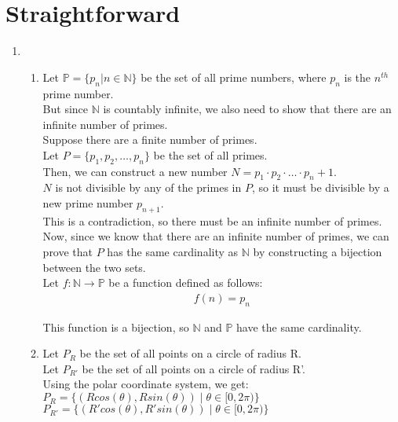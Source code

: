 \documentclass[a4paper]{article}
\begin{document}
\section{Straightforward}
    \begin{enumerate}
    \item \begin{enumerate}
        \item Let $\mathbb{P} = \{ p_n | n \in \mathbb{N} \}$ be the set of all prime numbers, where $p_n$ is the $n^{th}$ prime number.\\
        But since $\mathbb{N}$ is countably infinite, we also need to show that there are an infinite number of primes. \\
        
        Suppose there are a finite number of primes. \\
        Let $P = \{ p_1, p_2, \dots, p_n \}$ be the set of all primes. \\
        Then, we can construct a new number $N = p_1 \cdot p_2 \cdot \dots \cdot p_n + 1$.\\
        $N$ is not divisible by any of the primes in $P$, so it must be divisible by a new prime number $p_{n+1}$.\\
        This is a contradiction, so there must be an infinite number of primes.\\

        Now, since we know that there are an infinite number of primes, we can prove that $P$ has the same cardinality as $\mathbb{N}$ by constructing a bijection between the two sets.\\

        Let $f: \mathbb{N} \rightarrow \mathbb{P}$ be a function defined as follows:
        \begin{align*}
            f(n) = p_n
        \end{align*}

        This function is a bijection, so $\mathbb{N}$ and $\mathbb{P}$ have the same cardinality.\\

        \item Let $P_R$ be the set of all points on a circle of radius R.\\
        Let $P_{R'}$ be the set of all points on a circle of radius R'.\\

        Using the polar coordinate system, we get:\\
        $P_R = \{ (Rcos(\theta), Rsin(\theta)) \mid \theta \in [0, 2\pi) \}$\\
        $P_{R'} = \{ (R'cos(\theta), R'sin(\theta)) \mid \theta \in [0, 2\pi) \}$\\


\end{enumerate}
\end{enumerate}
\end{document}
